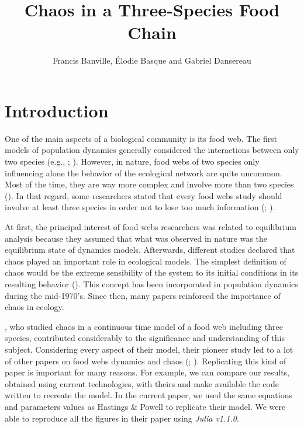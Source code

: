 \documentclass[
]{article}
\title{Chaos in a Three-Species Food Chain}
\author{Francis Banville, Élodie Basque and Gabriel Dansereau}
\date{}
\begin{document}
\maketitle

\hypertarget{introduction}{%
\section{Introduction}\label{introduction}}

One of the main aspects of a biological community is its food web. The
first models of population dynamics generally considered the
interactions between only two species (e.g., \textcite{canale1970};
\textcite{rosenzweig1963}). However, in nature, food webs of two species
only influencing alone the behavior of the ecological network are quite
uncommon. Most of the time, they are way more complex and involve more
than two species (\textcite{hastings1991}). In that regard, some
researchers stated that every food webs study should involve at least
three species in order not to lose too much information
(\textcite{price1980}; \textcite{rosenzweig1973}).

At first, the principal interest of food webs researchers was related to
equilibrium analysis because they assumed that what was observed in
nature was the equilibrium state of dynamics models. Afterwards,
different studies declared that chaos played an important role in
ecological models. The simplest definition of chaos would be the extreme
sensibility of the system to its initial conditions in its resulting
behavior (\textcite{hastings1993}). This concept has been incorporated
in population dynamics during the mid-1970's. Since then, many papers
reinforced the importance of chaos in ecology.

\textcite{hastings1991}, who studied chaos in a continuous time model of
a food web including three species, contributed considerably to the
significance and understanding of this subject. Considering every aspect
of their model, their pioneer study led to a lot of other papers on food
webs dynamics and chaos (\textcite{brose2006}; \textcite{gakkhar2012}).
Replicating this kind of paper is important for many reasons. For
example, we can compare our results, obtained using current
technologies, with theirs and make available the code written to
recreate the model. In the current paper, we used the same equations and
parameters values as Hastings \& Powell to replicate their model. We
were able to reproduce all the figures in their paper using \emph{Julia
v1.1.0}.
\end{document}
